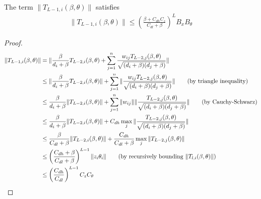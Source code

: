 \begin{lemma}
    The term $\|T_{L-1, i}(\beta, \theta)\| $ satisfies
    \begin{align*}
        \|T_{L-1, i}(\beta, \theta)\| \leq \left(\frac{\beta + C_{dh}C_z}{C_{dl} + \beta}\right)^L B_xB_\theta
    \end{align*}
\end{lemma}
\begin{proof}
\begin{align*}
    \|T_{L-1, i}(\beta, \theta)\|
    &= \|\frac{\beta}{d_i + \beta}T_{L-2, i}(\beta, \theta) + \sum_{j=1}^n \frac{w_{ij} T_{L-2, j}(\beta, \theta)}{\sqrt{(d_i+\beta)(d_j + \beta)}}\|\\
    &\leq \|\frac{\beta}{d_i + \beta}T_{L-2, i}(\beta, \theta)\| + \sum_{j=1}^n \|\frac{w_{ij} T_{L-2, j}(\beta, \theta)}{\sqrt{(d_i+\beta)(d_j + \beta)}}\| 
    \tag{by triangle inequality}\\
    &\leq \frac{\beta}{d_i + \beta}\|T_{L-2, i}(\beta, \theta)\| + \sum_{j=1}^n \|w_{ij}\|\|\frac{ T_{L-2, j}(\beta, \theta)}{\sqrt{(d_i+\beta)(d_j + \beta)}}\|
    \tag{by Cauchy-Schwarz}\\
    &\leq \frac{\beta}{d_i + \beta}\|T_{L-2, i}(\beta, \theta)\| + C_{dh} \max_{j}\|\frac{T_{L-2, j}(\beta, \theta)}{\sqrt{(d_i+\beta)(d_j + \beta)}}\| \\
    &\leq \frac{\beta}{C_{dl} + \beta}\|T_{L-2, i}(\beta, \theta)\| + \frac{C_{dh}}{C_{dl}+\beta} \max_j \|T_{L-2, j}(\beta, \theta)\|\\
    &\leq \left(\frac{C_{dh} + \beta}{C_{dl} + \beta}\right)^{L-1} \|z_i \theta_i\| 
    \tag{by recursively bounding $\|T_{l, i}(\beta, \theta)\|$}\\
    &\leq \left(\frac{C_{dh}}{C_{dl}}\right)^{L-1} C_z C_\theta
\end{align*}
\end{proof}

